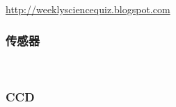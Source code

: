 \documentclass{beamer}
\begin{document}
{{{{{\hspace{3em}}

{\hspace{7em}}\href{http://weeklysciencequiz.blogspot.com}{http://weeklysciencequiz.blogspot.com}}{\begin{frame}
  \frametitle{传感器}
  
  \
  
\end{frame}}{\begin{frame}
  \frametitle{CCD}
  
  \
  

\end{frame}}}}}
\end{document}
